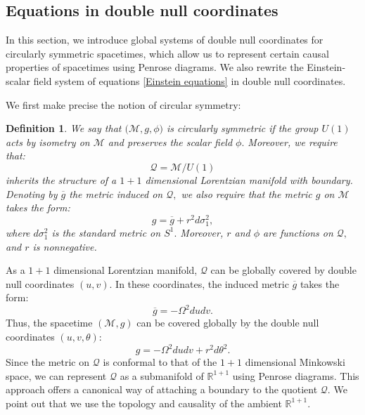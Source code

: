 \documentclass[11pt]{article}
\newtheorem{definition}{Definition}[section]
\numberwithin{equation}{section}
\begin{document}
\subsection{Equations in double null coordinates}\label{eq in double null section}

In this section, we introduce global systems of double null coordinates for circularly symmetric spacetimes, which allow us to represent certain causal properties of spacetimes using Penrose diagrams. We also rewrite the Einstein-scalar field system of equations \eqref{Einstein equations} in double null coordinates.

We first make precise the notion of circular symmetry:
\begin{definition} We say that $\big(\mathcal{M},g,\phi\big)$ is circularly symmetric if the group $U(1)$ acts by isometry on $\mathcal{M}$ and preserves the scalar field $\phi.$ Moreover, we require that:
        \[\mathcal{Q}=\mathcal{M}/U(1)\]
    inherits the structure of a $1+1$ dimensional Lorentzian manifold with boundary. Denoting by $\overline{g}$ the metric induced on $\mathcal{Q},$ we also require that the metric $g$ on $\mathcal{M}$ takes the form:
    \[g=\overline{g}+r^2d\sigma_1^2,\]
    where $d\sigma_1^2$ is the standard metric on $S^1.$ Moreover, $r$ and $\phi$ are functions on $\mathcal{Q},$ and $r$ is nonnegative.
\end{definition}

As a $1+1$ dimensional Lorentzian manifold, $\mathcal{Q}$ can be globally covered by double null coordinates $(u,v)$. In these coordinates, the induced metric $\overline{g}$ takes the form:
\[\overline{g}=-\Omega^2dudv.\]
Thus, the spacetime $(\mathcal{M},g)$ can be covered globally by the double null coordinates $(u,v,\theta):$
\begin{equation}\label{metric in double null}
    g=-\Omega^2dudv+r^2d\theta^2.
\end{equation}
Since the metric on $\mathcal{Q}$ is conformal to that of the $1+1$ dimensional Minkowski space, we can represent
$\mathcal{Q}$ as a submanifold of $\mathbb{R}^{1+1}$ using Penrose diagrams. This approach offers a canonical way of attaching a boundary to the quotient $\mathcal{Q}$. We point out that we use the topology and causality of the ambient $\mathbb{R}^{1+1}$.
\end{document}
